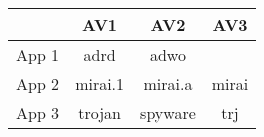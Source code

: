 \begin{tabular}{c|c c c}
    & AV1 & AV2 & AV3 \\
    \hline
    App 1 & adrd & adwo & \\
    App 2 & mirai.1 & mirai.a & mirai \\
    App 3 & trojan & spyware & trj \\
\end{tabular}
